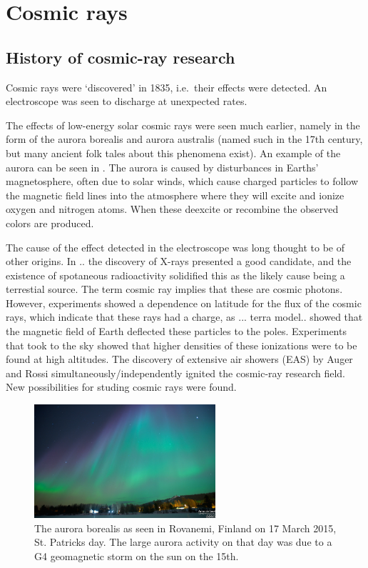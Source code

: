 \chapter{Cosmic rays}
\label{ch:cosmic-rays}

\section{History of cosmic-ray research}

Cosmic rays were `discovered' in 1835, i.e.\ their effects were detected. An electroscope was seen to discharge at unexpected rates.

The effects of low-energy solar cosmic rays were seen much earlier, namely in the form of the aurora borealis and aurora australis (named such in the 17th century, but many ancient folk tales about this phenomena exist). An example of the aurora can be seen in . The aurora is caused by disturbances in Earths' magnetosphere, often due to solar winds, which cause charged particles to follow the magnetic field lines into the atmosphere where they will excite and ionize oxygen and nitrogen atoms. When these deexcite or recombine the observed colors are produced.

The cause of the effect detected in the electroscope was long thought to be of other origins. In .. the discovery of X-rays presented a good candidate, and the existence of  spotaneous radioactivity solidified this as the likely cause being a terrestial source. The term cosmic ray implies that these are cosmic photons. However, experiments showed a dependence on latitude for the flux of the cosmic rays, which indicate that these rays had a charge, as ... terra model.. showed that the magnetic field of Earth deflected these particles to the poles. Experiments that took to the sky showed that higher densities of these ionizations were to be found at high altitudes. The discovery of extensive air showers (EAS) by Auger and Rossi simultaneously/independently ignited the cosmic-ray research field. New possibilities for studing cosmic rays were found.

\begin{figure}
    \centering
    \includegraphics[width=0.6\textwidth]{plots/cosmic-rays/aurora.png}
    \caption{The aurora borealis as seen in Rovanemi, Finland on 17 March 2015, St. Patricks day. The large aurora activity on that day was due to a G4 geomagnetic storm on the sun on the 15th.}
    \label{fig:aurora}
\end{figure}


